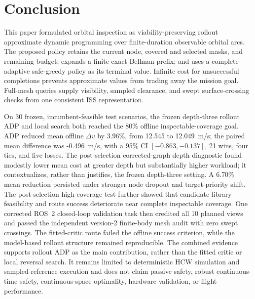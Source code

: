 \documentclass{IEEEtaes}
\newcommand{\unit}[2]{#1~#2}
\theoremstyle{remark}
\theoremstyle{plain}
\begin{document}
\section{Conclusion}
\label{sec:conclusion}

This paper formulated orbital inspection as viability-preserving rollout approximate dynamic programming over finite-duration observable orbital arcs. The proposed policy retains the current node, covered and selected masks, and remaining budget; expands a finite exact Bellman prefix; and uses a complete adaptive safe-greedy policy as its terminal value. Infinite cost for unsuccessful completions prevents approximate values from trading away the mission goal. Full-mesh queries supply visibility, sampled clearance, and swept surface-crossing checks from one consistent ISS representation.

On 30 frozen, incumbent-feasible test scenarios, the frozen depth-three rollout ADP and local search both reached the 80\% offline inspectable-coverage goal. ADP reduced mean offline $\Delta v$ by 3.96\%, from 12.545 to \unit{12.049}{m/s}; the paired mean difference was \unit{-0.496}{m/s}, with a 95\% CI $[-0.863,-0.137]$, 21 wins, four ties, and five losses. The post-selection corrected-graph depth diagnostic found modestly lower mean cost at greater depth but substantially higher workload; it contextualizes, rather than justifies, the frozen depth-three setting. A 6.70\% mean reduction persisted under stronger node dropout and target-priority shift. The post-selection high-coverage test further showed that candidate-library feasibility and route success deteriorate near complete inspectable coverage. One corrected ROS~2 closed-loop validation task then credited all 10 planned views and passed the independent version-2 finite-body mesh audit with zero swept crossings. The fitted-critic route failed the offline success criterion, while the model-based rollout structure remained reproducible. The combined evidence supports rollout ADP as the main contribution, rather than the fitted critic or local reversal search. It remains limited to deterministic HCW simulation and sampled-reference execution and does not claim passive safety, robust continuous-time safety, continuous-space optimality, hardware validation, or flight performance.
\end{document}
